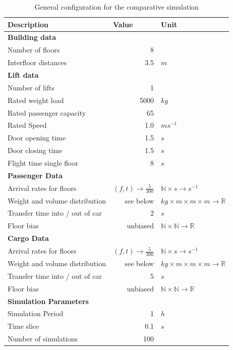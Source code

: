 \begin{table}[]
\centering
\begin{tabular}{lrl}
\textbf{Description} \hspace{5cm}   & \multicolumn{1}{l}{\textbf{Value}}   & \textbf{Unit}   \\
\hline
\multicolumn{3}{l}{\textbf{Building data}} \\
Number of floors & 8 &        \\
Interfloor distances & 3.5 & $m$\\
\hline
\multicolumn{3}{l}{\textbf{Lift data}}     \\
Number of lifts & 1 & \\
Rated weight load & 5000 & $kg$\\
Rated passenger capacity & 65 & \\
Rated Speed & 1.0 & $ms^{-1}$ \\
Door opening time & 1.5 & $s$\\
Door closing time & 1.5 & $s$\\
Flight time single floor & 8 & $s$\\
\hline
\multicolumn{3}{l}{\textbf{Passenger Data}}\\
Arrival rates for floors & $ (f, t) \rightarrow \frac{5}{300} $ & $ \mathbb{N} \times s \rightarrow s^{-1}$\\
Weight and volume distribution & see below & $kg \times m \times m \times m \rightarrow \mathbb{R}$\\
Transfer time into / out of car & 2 & $s$\\
Floor bias & unbiased & $ \mathbb{N} \times \mathbb{N} \rightarrow \mathbb{R} $ \\
\hline
\multicolumn{3}{l}{\textbf{Cargo Data}}\\
Arrival rates for floors & $ (f, t) \rightarrow \frac{5}{300} $ & $\mathbb{N} \times s \rightarrow s^{-1}$\\
Weight and volume distribution & see below & $kg \times m \times m \times m \rightarrow \mathbb{R}$\\
Transfer time into / out of car & 5 & $s$\\
Floor bias & unbiased & $ \mathbb{N} \times \mathbb{N} \rightarrow \mathbb{R} $ \\
\hline
\multicolumn{3}{l}{\textbf{Simulation Parameters}}\\
Simulation Period & 1 & $h$\\
Time slice & 0.1 & $s$\\
Number of simulations & 100 & \\
\end{tabular}
\caption{\label{tab:design:simulationconfig} General configuration for the comparative simulation}
\end{table}

